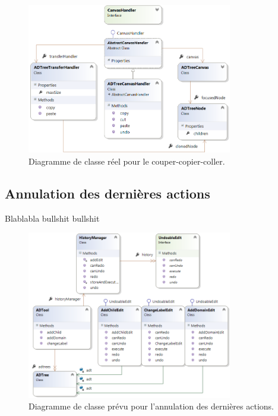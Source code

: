         \begin{figure}
            \centering
                \includegraphics[width=0.8\textwidth]{figure/copiercollerReel.png}
            \caption{Diagramme de classe réel pour le couper-copier-coller.}
            \label{fig:copypasteReel}
        \end{figure}
       
	\subsection{Annulation des dernières actions}
		Blablabla bullshit bullshit
        \begin{figure}
            \centering
                \includegraphics[width=0.8\textwidth]{figure/ctrlz.png}
            \caption{Diagramme de classe prévu pour l'annulation des dernières actions.}
            \label{fig:ctrlzPrevu}
        \end{figure}
        
